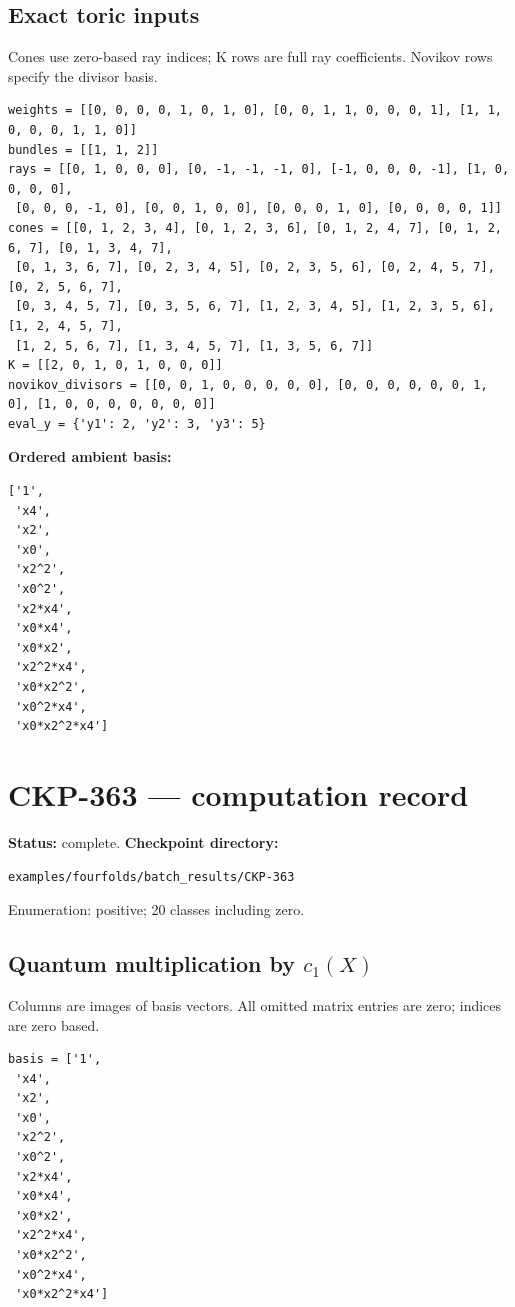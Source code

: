 \documentclass[10pt,a4paper]{article}
\begin{document}
\subsection*{Exact toric inputs}
Cones use zero-based ray indices; K rows are full ray coefficients. Novikov rows specify the divisor basis.

\begin{lstlisting}
weights = [[0, 0, 0, 0, 1, 0, 1, 0], [0, 0, 1, 1, 0, 0, 0, 1], [1, 1, 0, 0, 0, 1, 1, 0]]
bundles = [[1, 1, 2]]
rays = [[0, 1, 0, 0, 0], [0, -1, -1, -1, 0], [-1, 0, 0, 0, -1], [1, 0, 0, 0, 0],
 [0, 0, 0, -1, 0], [0, 0, 1, 0, 0], [0, 0, 0, 1, 0], [0, 0, 0, 0, 1]]
cones = [[0, 1, 2, 3, 4], [0, 1, 2, 3, 6], [0, 1, 2, 4, 7], [0, 1, 2, 6, 7], [0, 1, 3, 4, 7],
 [0, 1, 3, 6, 7], [0, 2, 3, 4, 5], [0, 2, 3, 5, 6], [0, 2, 4, 5, 7], [0, 2, 5, 6, 7],
 [0, 3, 4, 5, 7], [0, 3, 5, 6, 7], [1, 2, 3, 4, 5], [1, 2, 3, 5, 6], [1, 2, 4, 5, 7],
 [1, 2, 5, 6, 7], [1, 3, 4, 5, 7], [1, 3, 5, 6, 7]]
K = [[2, 0, 1, 0, 1, 0, 0, 0]]
novikov_divisors = [[0, 0, 1, 0, 0, 0, 0, 0], [0, 0, 0, 0, 0, 0, 1, 0], [1, 0, 0, 0, 0, 0, 0, 0]]
eval_y = {'y1': 2, 'y2': 3, 'y3': 5}
\end{lstlisting}

\textbf{Ordered ambient basis:}
\begin{lstlisting}
['1',
 'x4',
 'x2',
 'x0',
 'x2^2',
 'x0^2',
 'x2*x4',
 'x0*x4',
 'x0*x2',
 'x2^2*x4',
 'x0*x2^2',
 'x0^2*x4',
 'x0*x2^2*x4']
\end{lstlisting}

\clearpage\section*{CKP-363 --- computation record}
\textbf{Status:} complete.
\textbf{Checkpoint directory:}
\begin{lstlisting}
examples/fourfolds/batch_results/CKP-363
\end{lstlisting}

Enumeration: positive; 20 classes including zero.
\subsection*{Quantum multiplication by $c_1(X)$}
Columns are images of basis vectors. All omitted matrix entries are zero; indices are zero based.

\begin{lstlisting}
basis = ['1',
 'x4',
 'x2',
 'x0',
 'x2^2',
 'x0^2',
 'x2*x4',
 'x0*x4',
 'x0*x2',
 'x2^2*x4',
 'x0*x2^2',
 'x0^2*x4',
 'x0*x2^2*x4']
\end{lstlisting}
\end{document}
